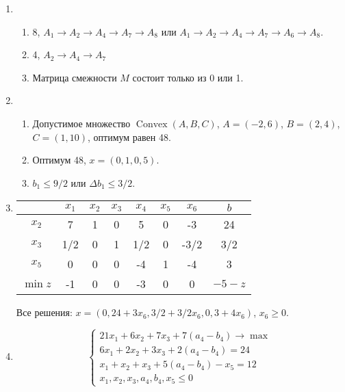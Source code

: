 \documentclass[12pt]{article}
\DeclareMathOperator{\Convex}{Convex}
\begin{document}
\begin{enumerate}
\begin{enumerate}
\end{enumerate}
  \item 
\begin{enumerate}
  \item 8, $A_1 \to A_2 \to A_4 \to A_7 \to A_8$ или $A_1 \to A_2 \to A_4 \to A_7 \to A_6 \to A_8$.
  \item 4, $A_2 \to A_4 \to A_7$
  \item Матрица смежности $M$ состоит только из 0 или 1. 
\end{enumerate}
\item 
\begin{enumerate}
  \item Допустимое множество $\Convex(A, B, C)$, $A = (-2, 6)$, $B = (2, 4)$, $C = (1, 10)$, оптимум равен 48.
  \item Оптимум 48, $x = (0, 1, 0, 5)$.
  \item $b_1 \leq 9/2$ или $\Delta b_1 \leq 3/2$.
\end{enumerate}
\item 

\begin{tabular}{ccccccc|c}
  \toprule
    & $x_1$ & $x_2$ & $x_3$ & $x_4$ & $x_5$ & $x_6$ & $b$  \\ \midrule
$x_2$ & 7 & 1 & 0 & 5 & 0 & -3 & 24  \\
$x_3$ & 1/2 & 0 & 1 & 1/2 & 0 & -3/2 & 3/2  \\
$x_5$ & 0 & 0 & 0 & -4 & 1 & -4 & 3  \\ \midrule
$\min z$ & -1 & 0 & 0 & -3 & 0 & 0 & $-5 - z$  \\ \bottomrule
\end{tabular}

Все решения: $x = (0, 24 + 3x_6, 3/2 + 3/2x_6, 0, 3 + 4x_6)$, $x_6 \geq 0$. 

\item 
\[
\begin{cases}
  21x_1 + 6x_2 + 7x_3 + 7(a_4 - b_4) \to \max \\
  6x_1 + 2x_2 + 3x_3 + 2(a_4 - b_4) = 24 \\
  x_1 + x_2 + x_3 + 5(a_4 - b_4) - x_5 = 12 \\
  x_1, x_2, x_3, a_4, b_4, x_5 \leq 0    
\end{cases}
\]


\end{enumerate}
\end{document}
